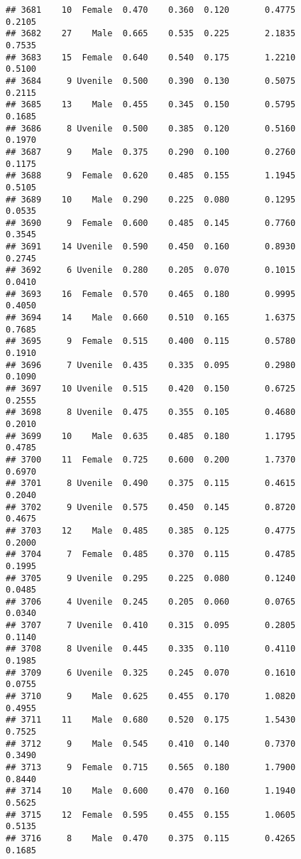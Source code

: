 \documentclass[
]{article}
\begin{document}
\begin{verbatim}
## 3681    10  Female  0.470    0.360  0.120       0.4775         0.2105
## 3682    27    Male  0.665    0.535  0.225       2.1835         0.7535
## 3683    15  Female  0.640    0.540  0.175       1.2210         0.5100
## 3684     9 Uvenile  0.500    0.390  0.130       0.5075         0.2115
## 3685    13    Male  0.455    0.345  0.150       0.5795         0.1685
## 3686     8 Uvenile  0.500    0.385  0.120       0.5160         0.1970
## 3687     9    Male  0.375    0.290  0.100       0.2760         0.1175
## 3688     9  Female  0.620    0.485  0.155       1.1945         0.5105
## 3689    10    Male  0.290    0.225  0.080       0.1295         0.0535
## 3690     9  Female  0.600    0.485  0.145       0.7760         0.3545
## 3691    14 Uvenile  0.590    0.450  0.160       0.8930         0.2745
## 3692     6 Uvenile  0.280    0.205  0.070       0.1015         0.0410
## 3693    16  Female  0.570    0.465  0.180       0.9995         0.4050
## 3694    14    Male  0.660    0.510  0.165       1.6375         0.7685
## 3695     9  Female  0.515    0.400  0.115       0.5780         0.1910
## 3696     7 Uvenile  0.435    0.335  0.095       0.2980         0.1090
## 3697    10 Uvenile  0.515    0.420  0.150       0.6725         0.2555
## 3698     8 Uvenile  0.475    0.355  0.105       0.4680         0.2010
## 3699    10    Male  0.635    0.485  0.180       1.1795         0.4785
## 3700    11  Female  0.725    0.600  0.200       1.7370         0.6970
## 3701     8 Uvenile  0.490    0.375  0.115       0.4615         0.2040
## 3702     9 Uvenile  0.575    0.450  0.145       0.8720         0.4675
## 3703    12    Male  0.485    0.385  0.125       0.4775         0.2000
## 3704     7  Female  0.485    0.370  0.115       0.4785         0.1995
## 3705     9 Uvenile  0.295    0.225  0.080       0.1240         0.0485
## 3706     4 Uvenile  0.245    0.205  0.060       0.0765         0.0340
## 3707     7 Uvenile  0.410    0.315  0.095       0.2805         0.1140
## 3708     8 Uvenile  0.445    0.335  0.110       0.4110         0.1985
## 3709     6 Uvenile  0.325    0.245  0.070       0.1610         0.0755
## 3710     9    Male  0.625    0.455  0.170       1.0820         0.4955
## 3711    11    Male  0.680    0.520  0.175       1.5430         0.7525
## 3712     9    Male  0.545    0.410  0.140       0.7370         0.3490
## 3713     9  Female  0.715    0.565  0.180       1.7900         0.8440
## 3714    10    Male  0.600    0.470  0.160       1.1940         0.5625
## 3715    12  Female  0.595    0.455  0.155       1.0605         0.5135
## 3716     8    Male  0.470    0.375  0.115       0.4265         0.1685

\end{verbatim}
\end{document}
